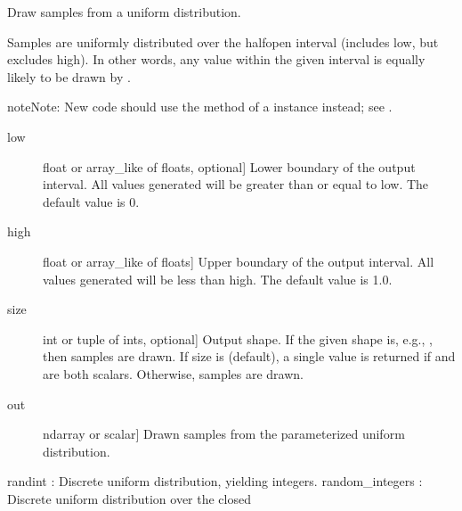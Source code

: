 \documentclass[letterpaper,10pt,english]{sphinxmanual}
\begin{document}
\begin{fulllineitems}
\label{\detokenize{infrapy.utils:infrapy.utils.ref2sac.uniform}}
Draw samples from a uniform distribution.

Samples are uniformly distributed over the half\sphinxhyphen{}open interval
\sphinxcode{\sphinxupquote{{[}low, high)}} (includes low, but excludes high).  In other words,
any value within the given interval is equally likely to be drawn
by .

\begin{sphinxadmonition}{note}{Note:}
New code should use the  method of a 
instance instead; see .
\end{sphinxadmonition}
\begin{description}
\item[{low}] \leavevmode{[}float or array\_like of floats, optional{]}
Lower boundary of the output interval.  All values generated will be
greater than or equal to low.  The default value is 0.

\item[{high}] \leavevmode{[}float or array\_like of floats{]}
Upper boundary of the output interval.  All values generated will be
less than high.  The default value is 1.0.

\item[{size}] \leavevmode{[}int or tuple of ints, optional{]}
Output shape.  If the given shape is, e.g., , then
 samples are drawn.  If size is  (default),
a single value is returned if  and  are both scalars.
Otherwise,  samples are drawn.

\end{description}
\begin{description}
\item[{out}] \leavevmode{[}ndarray or scalar{]}
Drawn samples from the parameterized uniform distribution.

\end{description}

randint : Discrete uniform distribution, yielding integers.
random\_integers : Discrete uniform distribution over the closed
\begin{quote}


\end{quote}
\end{fulllineitems}
\end{document}
